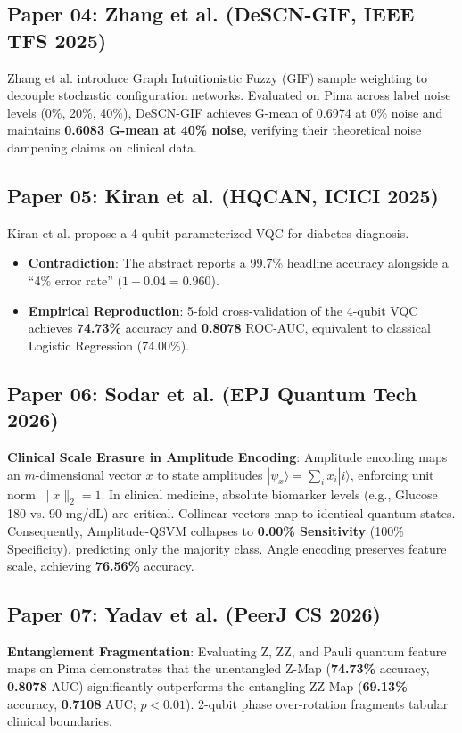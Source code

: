 \documentclass[10pt,journal,compsoc]{IEEEtran}
\begin{document}
\subsection{Paper 04: Zhang et al. (DeSCN-GIF, IEEE TFS 2025)}
Zhang et al. introduce Graph Intuitionistic Fuzzy (GIF) sample weighting to decouple stochastic configuration networks. Evaluated on Pima across label noise levels (0\%, 20\%, 40\%), DeSCN-GIF achieves G-mean of 0.6974 at 0\% noise and maintains \textbf{0.6083 G-mean at 40\% noise}, verifying their theoretical noise dampening claims on clinical data.

\subsection{Paper 05: Kiran et al. (HQCAN, ICICI 2025)}
Kiran et al. propose a 4-qubit parameterized VQC for diabetes diagnosis.
\begin{itemize}
    \item \textbf{Contradiction}: The abstract reports a 99.7\% headline accuracy alongside a ``4\% error rate'' ($1 - 0.04 = 0.960$).
    \item \textbf{Empirical Reproduction}: 5-fold cross-validation of the 4-qubit VQC achieves \textbf{74.73\%} accuracy and \textbf{0.8078} ROC-AUC, equivalent to classical Logistic Regression (74.00\%).
\end{itemize}

\subsection{Paper 06: Sodar et al. (EPJ Quantum Tech 2026)}
\textbf{Clinical Scale Erasure in Amplitude Encoding}: Amplitude encoding maps an $m$-dimensional vector $x$ to state amplitudes $|\psi_x\rangle = \sum_i x_i |i\rangle$, enforcing unit norm $\|x\|_2 = 1$. In clinical medicine, absolute biomarker levels (e.g., Glucose 180 vs. 90 mg/dL) are critical. Collinear vectors map to identical quantum states. Consequently, Amplitude-QSVM collapses to \textbf{0.00\% Sensitivity} (100\% Specificity), predicting only the majority class. Angle encoding preserves feature scale, achieving \textbf{76.56\%} accuracy.

\subsection{Paper 07: Yadav et al. (PeerJ CS 2026)}
\textbf{Entanglement Fragmentation}: Evaluating Z, ZZ, and Pauli quantum feature maps on Pima demonstrates that the unentangled Z-Map (\textbf{74.73\%} accuracy, \textbf{0.8078} AUC) significantly outperforms the entangling ZZ-Map (\textbf{69.13\%} accuracy, \textbf{0.7108} AUC; $p < 0.01$). 2-qubit phase over-rotation fragments tabular clinical boundaries.
\end{document}
